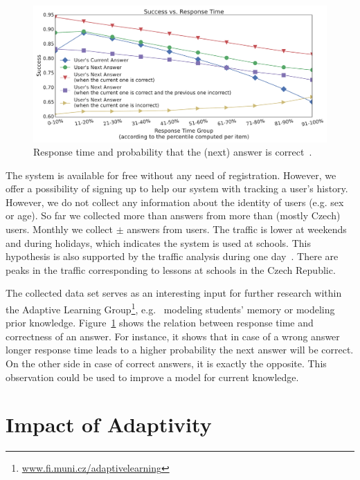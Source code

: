 \documentclass[table,color,cover,twoside,nolot,nolof]{fithesis3/fithesis3}
\begin{document}
\begin{figure}[h]
	\begin{center}
		\includegraphics[width=\textwidth]{figure/response_time}
		\caption{Response time and probability that the (next) answer is correct~\cite{papousek2015analysis}.}
		\label{figure:response_time}
	\end{center}
\end{figure}

The system is available for free without any need of registration. However, we
offer a possibility of signing up to help our system with tracking a user's
history. However, we do not collect any information about the identity of users
(e.g. sex or age). So far we collected more than  answers
from more than  (mostly Czech) users. Monthly we collect $\pm$
 answers from  users. The traffic is lower at
weekends and during holidays, which indicates the system is used at schools.
This hypothesis is also supported by the traffic analysis during one
day~\cite{stanislav2015factual}. There are peaks in the traffic corresponding to
lessons at schools in the Czech Republic.

The collected data set serves as an interesting input for further research
within the Adaptive Learning Group\footnote{\url{www.fi.muni.cz/adaptivelearning}},
e.g.~\cite{pelanek2015modeling} modeling students' memory or
\cite{niznan2015student} modeling prior knowledge.
Figure~\ref{figure:response_time} shows the relation between response time and
correctness of an answer. For instance, it shows that in case of a wrong answer
longer response time leads to a higher probability the next answer will be
correct. On the other side in case of correct answers, it is exactly the
opposite. This observation could be used to improve a model for current
knowledge.

\section{Impact of Adaptivity}
\end{document}
